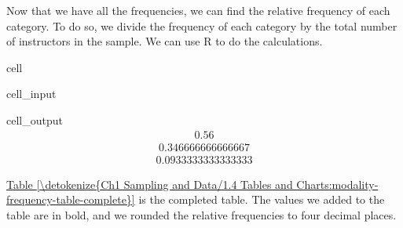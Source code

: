 \documentclass[letterpaper,10pt,english]{jupyterBook}
\begin{document}
\sphinxAtStartPar
Now that we have all the frequencies, we can find the relative frequency of each category. To do so, we divide the frequency of each category by the total number of instructors in the sample. We can use R to do the calculations.

\begin{sphinxuseclass}{cell}\begin{sphinxVerbatimInput}

\begin{sphinxuseclass}{cell_input}
\begin{sphinxVerbatim}[commandchars=\\\{\}]


\end{sphinxVerbatim}

\end{sphinxuseclass}\end{sphinxVerbatimInput}
\begin{sphinxVerbatimOutput}

\begin{sphinxuseclass}{cell_output}\begin{equation*}
\begin{split}0.56\end{split}
\end{equation*}\begin{equation*}
\begin{split}0.346666666666667\end{split}
\end{equation*}\begin{equation*}
\begin{split}0.0933333333333333\end{split}
\end{equation*}
\end{sphinxuseclass}\end{sphinxVerbatimOutput}

\end{sphinxuseclass}
\sphinxAtStartPar
\hyperref[\detokenize{Ch1 Sampling and Data/1.4 Tables and Charts:modality-frequency-table-complete}]{Table \ref{\detokenize{Ch1 Sampling and Data/1.4 Tables and Charts:modality-frequency-table-complete}}} is the completed table. The values we added to the table are in bold, and we rounded the relative frequencies to four decimal places.
\end{document}
